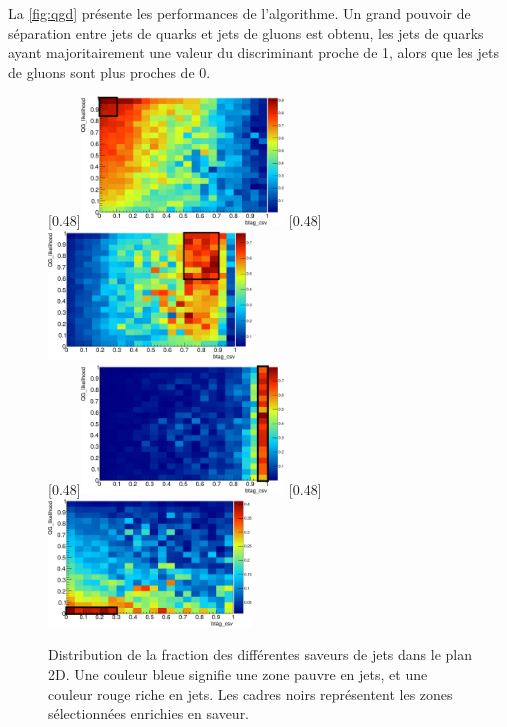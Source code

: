 La \cref{fig:qgd} présente les performances de l'algorithme. Un grand pouvoir de séparation entre jets de quarks et jets de gluons est obtenu, les jets de quarks ayant majoritairement une valeur du discriminant proche de 1, alors que les jets de gluons sont plus proches de 0.

\begin{figure}[p!] \centering
    [0.48\textwidth]{\includegraphics[width=0.48\textwidth]{chapitre4/figs/flavor/2DTaggingPlan_uds_ptPhot_100_800_stageM2.pdf}}
    [0.48\textwidth]{\includegraphics[width=0.48\textwidth]{chapitre4/figs/flavor/2DTaggingPlan_c_ptPhot_100_800_stageM2.pdf}} \\
    [0.48\textwidth]{\includegraphics[width=0.48\textwidth]{chapitre4/figs/flavor/2DTaggingPlan_b_ptPhot_100_800_stageM2.pdf}}
    [0.48\textwidth]{\includegraphics[width=0.48\textwidth]{chapitre4/figs/flavor/2DTaggingPlan_g_ptPhot_100_800_stageM2.pdf}}
    \caption{Distribution de la fraction des différentes saveurs de jets dans le plan 2D. Une couleur bleue signifie une zone pauvre en jets, et une couleur rouge riche en jets. Les cadres noirs représentent les zones sélectionnées enrichies en saveur.}
    \label{fig:2d_zones}
\end{figure}

